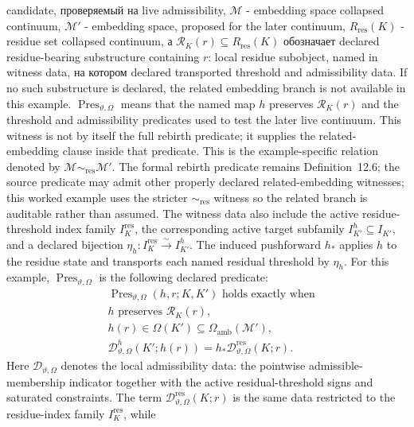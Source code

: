 candidate, проверяемый на live admissibility, \(\mathcal{M}\) - embedding
space collapsed continuum, \(\mathcal{M}'\) - embedding space, proposed for
the later continuum, \(R_{\mathrm{res}}(K)\) - residue set collapsed
continuum, а \(\mathcal{R}_K(r)\subseteq R_{\mathrm{res}}(K)\) обозначает
declared residue-bearing substructure containing \(r\): local residue
subobject, named in witness data, на котором declared transported threshold
and admissibility data. If no such substructure is declared, the related
embedding branch is not available in this example.
\(\operatorname{Pres}_{\vartheta,\Omega}\) means that the named map \(h\)
preserves \(\mathcal{R}_K(r)\) and the threshold and admissibility
predicates used to test the later live continuum. This witness is not by
itself the full rebirth predicate; it supplies the related-embedding clause
inside that predicate. This is the example-specific relation denoted by
\(\mathcal{M}\sim_{\mathrm{res}}\mathcal{M}'\). The formal rebirth predicate
remains Definition~12.6; the source predicate may admit other properly
declared related-embedding witnesses; this worked example uses the stricter
\(\sim_{\mathrm{res}}\) witness so the related branch is auditable rather than
assumed.
The witness data also include the active residue-threshold index family
\(I_K^{\mathrm{res}}\), the corresponding active target subfamily
\(I_{K'}^{h}\subseteq I_{K'}\), and a declared bijection
\(\eta_h:I_K^{\mathrm{res}}\xrightarrow{\sim}I_{K'}^{h}\). The induced
pushforward \(h_\ast\) applies \(h\) to the residue state and transports each
named residual threshold by \(\eta_h\).
For this example, \(\operatorname{Pres}_{\vartheta,\Omega}\) is the following
declared predicate:
\[
\begin{aligned}
&\operatorname{Pres}_{\vartheta,\Omega}(h,r;K,K')
  \text{ holds exactly when}\\
&h \text{ preserves } \mathcal{R}_K(r),\\
&h(r)\in\Omega(K')\subseteq\Omega_{\mathrm{amb}}(\mathcal{M}'),\\
&\mathcal{D}^{h}_{\vartheta,\Omega}(K';h(r))
  =h_{\ast}\mathcal{D}^{\mathrm{res}}_{\vartheta,\Omega}(K;r).
\end{aligned}
\]
Here \(\mathcal{D}_{\vartheta,\Omega}\) denotes the local admissibility data:
the pointwise admissible-membership indicator together with the active
residual-threshold signs and saturated constraints. The term
\(\mathcal{D}^{\mathrm{res}}_{\vartheta,\Omega}(K;r)\) is the same data
restricted to the residue-index family \(I_K^{\mathrm{res}}\), while
